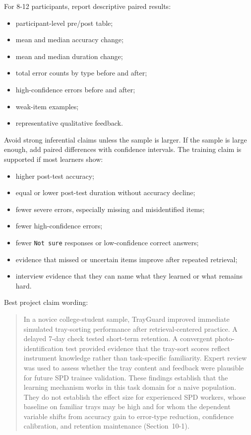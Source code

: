 \documentclass[10pt,a4paper]{article}
\begin{document}
For 8-12 participants, report descriptive paired results:
\begin{itemize}
  \item participant-level pre/post table;
  \item mean and median accuracy change;
  \item mean and median duration change;
  \item total error counts by type before and after;
  \item high-confidence errors before and after;
  \item weak-item examples;
  \item representative qualitative feedback.
\end{itemize}
Avoid strong inferential claims unless the sample is larger. If the sample is
large enough, add paired differences with confidence intervals.
The training claim is supported if most learners show:
\begin{itemize}
  \item higher post-test accuracy;
  \item equal or lower post-test duration without accuracy decline;
  \item fewer severe errors, especially missing and misidentified items;
  \item fewer high-confidence errors;
  \item fewer \texttt{Not sure} responses or low-confidence correct answers;
  \item evidence that missed or uncertain items improve after repeated retrieval;
  \item interview evidence that they can name what they learned or what remains hard.
\end{itemize}
Best project claim wording:
\begin{quote}
In a novice college-student sample, TrayGuard improved immediate simulated
tray-sorting performance after retrieval-centered practice. A delayed
7-day check tested short-term retention. A convergent photo-identification test
provided evidence that the tray-sort scores reflect instrument knowledge rather
than task-specific familiarity. Expert review was used to assess whether the
tray content and feedback were plausible for future SPD trainee validation.
These findings establish that the learning mechanism works in this task domain
for a naive population. They do not establish the effect size for experienced
SPD workers, whose baseline on familiar trays may be high and for whom the
dependent variable shifts from accuracy gain to error-type reduction,
confidence calibration, and retention maintenance (Section~10-1).
\end{quote}
\end{document}
